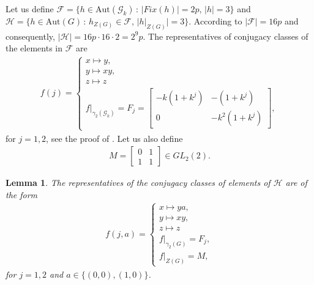 \documentclass[a4paper, english, 9pt]{amsart}
\theoremstyle{plain}
\newtheorem{lemma}[theorem]{Lemma}
\theoremstyle{definition}
\def\aut#1{\mathrm{Aut}(#1)}
\def\setof#1#2{\{#1\,\colon\,#2\}}
\begin{document}
Let us define $\mathcal{F}=\setof{h\in \aut{\mathcal{G}_k}}{|Fix(h)|=2p,\, |h|=3}$ and $\mathcal{H}=\setof{h\in \aut{G}}{h_{Z(G)}\in \mathcal{F},\, |h|_{Z(G)}|=3}$. According to \cite[Lemma 7.7]{LSS} $|\mathcal{F}|=16p$ and consequently, $|\mathcal{H}|=16p\cdot 16\cdot 2=2^9p$. The representatives of conjugacy classes of the elements in $\mathcal{F}$ are 
\begin{align} 
        f(j)=\begin{cases}
          x\mapsto y,\\
                  y\mapsto xy,\\
                  z\mapsto z\\   f|_{\gamma_2(\mathcal{G}_k)}=F_j=\begin{bmatrix}
                      -k(1+k^j) & -(1+k^j)\\
                      0 & -k^2(1+k^j)
                  \end{bmatrix},
       \end{cases}
    \end{align}
for $j=1,2$, see the proof of \cite[Theorem 5.5]{LSS}. Let us also define
\begin{align*}
    M=\begin{bmatrix}
        0& 1\\
        1 & 1
    \end{bmatrix}\in GL_2(2).
\end{align*}
    
\begin{lemma}\label{iso classes of sr}
   The representatives of the conjugacy classes of elements of $\mathcal{H}$ are of the form
   \begin{align*}%
        f(j,a)=\begin{cases}
          x\mapsto ya,\\
                  y\mapsto xy ,\\
                  z\mapsto z\\   f|_{\gamma_2(G)}=F_j,\\
                  f|_{Z(G)}=M,
        \end{cases}
    \end{align*}
   for $j=1,2$ and $a\in \{(0,0),(1,0)\}$.
\end{lemma}
\end{document}
